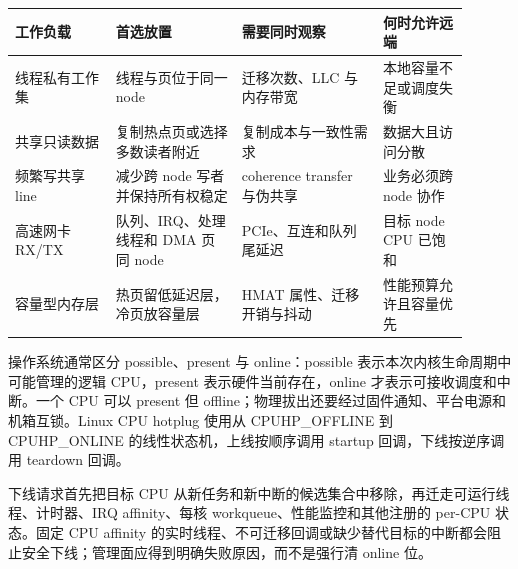 \begin{longtable}{L{0.20\linewidth}L{0.25\linewidth}L{0.28\linewidth}L{0.17\linewidth}}
\toprule
工作负载 & 首选放置 & 需要同时观察 & 何时允许远端 \\
\midrule
线程私有工作集 & 线程与页位于同一 node & 迁移次数、LLC 与内存带宽 & 本地容量不足或调度失衡 \\\tablerowrule
共享只读数据 & 复制热点页或选择多数读者附近 & 复制成本与一致性需求 & 数据大且访问分散 \\\tablerowrule
频繁写共享 line & 减少跨 node 写者并保持所有权稳定 & coherence transfer 与伪共享 & 业务必须跨 node 协作 \\\tablerowrule
高速网卡 RX/TX & 队列、IRQ、处理线程和 DMA 页同 node & PCIe、互连和队列尾延迟 & 目标 node CPU 已饱和 \\\tablerowrule
容量型内存层 & 热页留低延迟层，冷页放容量层 & HMAT 属性、迁移开销与抖动 & 性能预算允许且容量优先 \\
\bottomrule
\end{longtable}


操作系统通常区分 possible、present 与 online：possible 表示本次内核生命周期中可能管理的逻辑 CPU，present 表示硬件当前存在，online 才表示可接收调度和中断。一个 CPU 可以 present 但 offline；物理拔出还要经过固件通知、平台电源和机箱互锁。Linux CPU hotplug 使用从 CPUHP\_OFFLINE 到 CPUHP\_ONLINE 的线性状态机，上线按顺序调用 startup 回调，下线按逆序调用 teardown 回调。\cite{linux-cpu-hotplug}

下线请求首先把目标 CPU 从新任务和新中断的候选集合中移除，再迁走可运行线程、计时器、IRQ affinity、每核 workqueue、性能监控和其他注册的 per-CPU 状态。固定 CPU affinity 的实时线程、不可迁移回调或缺少替代目标的中断都会阻止安全下线；管理面应得到明确失败原因，而不是强行清 online 位。

